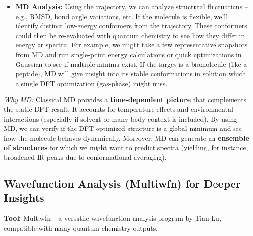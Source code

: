 \documentclass[11pt]{article}
\begin{document}
\begin{itemize}
  \item \textbf{MD Analysis:} Using the trajectory, we can analyze structural fluctuations -- e.g., RMSD, bond angle variations, etc. If the molecule is flexible, we’ll identify distinct low-energy conformers from the trajectory. These conformers could then be re-evaluated with quantum chemistry to see how they differ in energy or spectra. For example, we might take a few representative snapshots from MD and run single-point energy calculations or quick optimizations in Gaussian to see if multiple minima exist. If the target is a biomolecule (like a peptide), MD will give insight into its stable conformations in solution which a single DFT optimization (gas-phase) might miss.
\end{itemize}

\emph{Why MD:} Classical MD provides a \textbf{time-dependent picture} that complements the static DFT result. It accounts for temperature effects and environmental interactions (especially if solvent or many-body context is included). By using MD, we can verify if the DFT-optimized structure is a global minimum and see how the molecule behaves dynamically. Moreover, MD can generate an \textbf{ensemble of structures} for which we might want to predict spectra (yielding, for instance, broadened IR peaks due to conformational averaging).

\subsection{Wavefunction Analysis (Multiwfn) for Deeper Insights}
\textbf{Tool:} Multiwfn -- a versatile wavefunction analysis program by Tian Lu, compatible with many quantum chemistry outputs.
\end{document}
